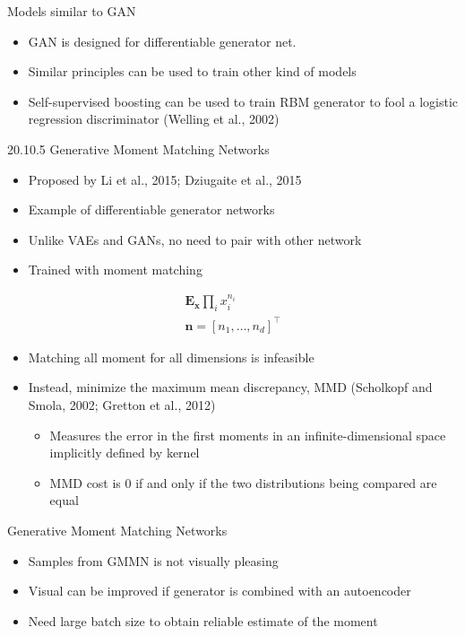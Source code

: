 \documentclass[dvipdfmx,presentation]{beamer}
\def\bf{\mathbf}
\begin{document}
\begin{frame}[label={sec:orgheadline34}]{Models similar to GAN}
\begin{itemize}
\item GAN is designed for differentiable generator net.
\item Similar principles can be used to train other kind of models
\item \alert{\alert{Self-supervised boosting}} can be used to train RBM generator to fool a logistic regression discriminator (Welling et al., 2002)
\end{itemize}
\end{frame}

\begin{frame}[label={sec:orgheadline35}]{20.10.5 Generative Moment Matching Networks}
\begin{itemize}
\item Proposed by Li et al., 2015; Dziugaite et al., 2015
\item Example of differentiable generator networks
\item Unlike VAEs and GANs, no need to pair with other network
\item Trained with \alert{\alert{moment matching}}
\end{itemize}
\begin{align*}
\bf{E}_{\bf{x}} \prod_{i} x_{i}^{n_{i}} \tag{20.82}\\
\bf{n} = [n_{1}, \ldots, n_{d}]^{\top}
\end{align*}

\begin{itemize}
\item Matching all moment for all dimensions is infeasible
\item Instead, minimize the maximum mean discrepancy, MMD (Scholkopf and Smola, 2002; Gretton et al., 2012)
\begin{itemize}
\item Measures the error in the first moments in an infinite-dimensional space implicitly defined by kernel
\item MMD cost is 0 if and only if the two distributions being compared are equal
\end{itemize}
\end{itemize}
\end{frame}

\begin{frame}[label={sec:orgheadline36}]{Generative Moment Matching Networks}
\begin{itemize}
\item Samples from GMMN is not visually pleasing
\item Visual can be improved if generator is combined with an autoencoder
\item Need large batch size to obtain reliable estimate of the moment
\end{itemize}
\end{frame}
\end{document}
